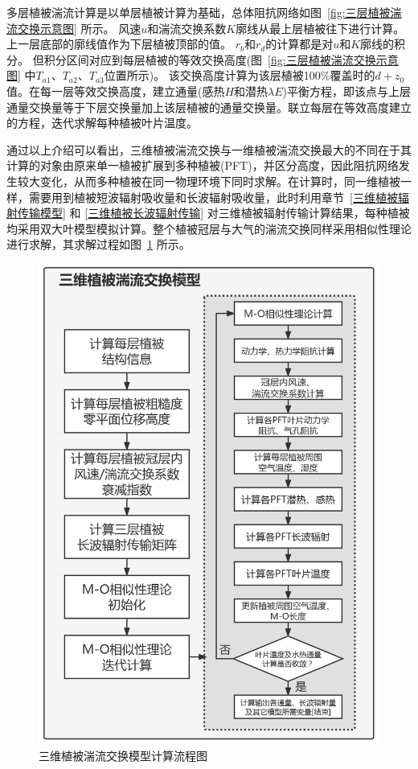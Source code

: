 多层植被湍流计算是以单层植被计算为基础，总体阻抗网络如图~\ref{fig:三层植被湍流交换示意图} 所示。
风速$u$和湍流交换系数$K$廓线从最上层植被往下进行计算。上一层底部的廓线值作为下层植被顶部的值。
$r_b$和$r_d$的计算都是对$u$和$K$廓线的积分。
但积分区间对应到每层植被的等效交换高度(图~\ref{fig:三层植被湍流交换示意图} 中$T_{a1}$、$T_{a2}$、$T_{a3}$位置所示)。
该交换高度计算为该层植被100\%覆盖时的$d+z_0$值。在每一层等效交换高度，建立通量(感热$H$和潜热$\lambda E$)平衡方程，即该点与上层通量交换量等于下层交换量加上该层植被的通量交换量。联立每层在等效高度建立的方程，迭代求解每种植被叶片温度。

通过以上介绍可以看出，三维植被湍流交换与一维植被湍流交换最大的不同在于其计算的对象由原来单一植被扩展到多种植被(PFT)，并区分高度，因此阻抗网络发生较大变化，从而多种植被在同一物理环境下同时求解。在计算时，同一维植被一样，需要用到植被短波辐射吸收量和长波辐射吸收量，此时利用章节~\ref{三维植被辐射传输模型} 和 \ref{三维植被长波辐射传输} 对三维植被辐射传输计算结果，每种植被均采用双大叶模型模拟计算。整个植被冠层与大气的湍流交换同样采用相似性理论进行求解，其求解过程如图~\ref{fig:三维植被湍流交换模型计算流程图} 所示。
{
\begin{figure}[htbp]
\centering
\includegraphics[width=0.75\linewidth]{Figures/地表湍流交换过程/三维植被湍流交换模型计算流程图_v2.png}
\caption{三维植被湍流交换模型计算流程图}
\label{fig:三维植被湍流交换模型计算流程图}
\end{figure}
}

